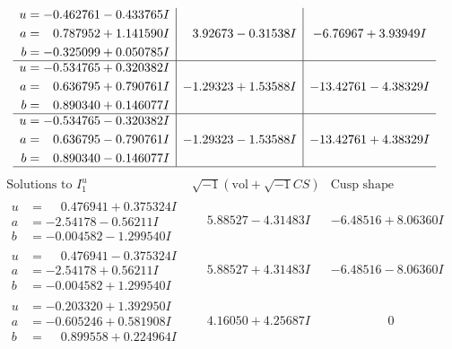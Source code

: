 \documentclass[1p]{elsarticle_modified}
\theoremstyle{definition}
\newcommand{\I}{\sqrt{-1}}
\begin{document}
$$\begin{array}{c|c|c}
\begin{aligned}
u &= -0.462761 - 0.433765 I \\
a &= \phantom{-}0.787952 + 1.141590 I \\
b &= -0.325099 + 0.050785 I\end{aligned}
 & \phantom{-}3.92673 - 0.31538 I & -6.76967 + 3.93949 I \\ \hline\begin{aligned}
u &= -0.534765 + 0.320382 I \\
a &= \phantom{-}0.636795 + 0.790761 I \\
b &= \phantom{-}0.890340 + 0.146077 I\end{aligned}
 & -1.29323 + 1.53588 I & -13.42761 - 4.38329 I \\ \hline\begin{aligned}
u &= -0.534765 - 0.320382 I \\
a &= \phantom{-}0.636795 - 0.790761 I \\
b &= \phantom{-}0.890340 - 0.146077 I\end{aligned}
 & -1.29323 - 1.53588 I & -13.42761 + 4.38329 I\\
 \hline 
 \end{array}$$\newpage$$\begin{array}{c|c|c}  
\text{Solutions to }I^u_{1}& \I (\text{vol} + \sqrt{-1}CS) & \text{Cusp shape}\\
 \hline 
\begin{aligned}
u &= \phantom{-}0.476941 + 0.375324 I \\
a &= -2.54178 - 0.56211 I \\
b &= -0.004582 - 1.299540 I\end{aligned}
 & \phantom{-}5.88527 - 4.31483 I & -6.48516 + 8.06360 I \\ \hline\begin{aligned}
u &= \phantom{-}0.476941 - 0.375324 I \\
a &= -2.54178 + 0.56211 I \\
b &= -0.004582 + 1.299540 I\end{aligned}
 & \phantom{-}5.88527 + 4.31483 I & -6.48516 - 8.06360 I \\ \hline\begin{aligned}
u &= -0.203320 + 1.392950 I \\
a &= -0.605246 + 0.581908 I \\
b &= \phantom{-}0.899558 + 0.224964 I\end{aligned}
 & \phantom{-}4.16050 + 4.25687 I & \phantom{-0.000000 } 0 \\ \hline\begin{aligned}

\end{aligned}
\end{array}$$
\end{document}
